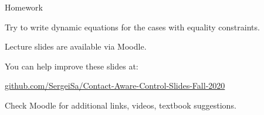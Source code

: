 \documentclass{beamer}
\begin{document}
\begin{frame}{Homework}
\begin{flushleft}

Try to write dynamic equations for the cases with equality constraints.

\end{flushleft}
\end{frame}




\begin{frame}
\centerline{Lecture slides are available via Moodle.}
\bigskip
\centerline{You can help improve these slides at:}
\centerline{\href{https://github.com/SergeiSa/Contact-Aware-Control-Slides-Fall-2020}{github.com/SergeiSa/Contact-Aware-Control-Slides-Fall-2020}}
\bigskip
\centerline{Check Moodle for additional links, videos, textbook suggestions.}
\end{frame}
\end{document}
